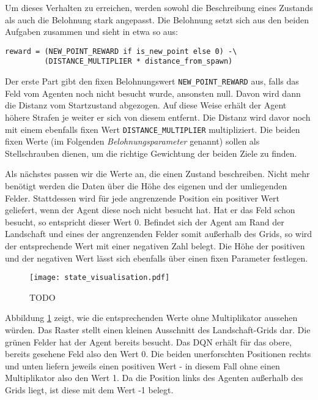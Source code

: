 Um dieses Verhalten zu erreichen, werden sowohl die Beschreibung eines Zustands als auch die Belohnung stark angepasst. Die Belohnung setzt sich aus den beiden Aufgaben zusammen und sieht in etwa so aus:
\begin{verbatim}
reward = (NEW_POINT_REWARD if is_new_point else 0) -\
         (DISTANCE_MULTIPLIER * distance_from_spawn)
\end{verbatim}
Der erste Part gibt den fixen Belohnungswert \texttt{NEW_POINT_REWARD} aus, falls das Feld vom Agenten noch nicht besucht wurde, ansonsten null. Davon wird dann die Distanz vom Startzustand abgezogen. Auf diese Weise erhält der Agent höhere Strafen je weiter er sich von diesem entfernt. Die Distanz wird davor noch mit einem ebenfalls fixen Wert \texttt{DISTANCE_MULTIPLIER} multipliziert. Die beiden fixen Werte (im Folgenden \textit{Belohnungsparameter} genannt) sollen als Stellschrauben dienen, um die richtige Gewichtung der beiden Ziele zu finden.

Als nächstes passen wir die Werte an, die einen Zustand beschreiben. Nicht mehr benötigt werden die Daten über die Höhe des eigenen und der umliegenden Felder. Stattdessen wird für jede angrenzende Position ein positiver Wert geliefert, wenn der Agent diese noch nicht besucht hat. Hat er das Feld schon besucht, so entspricht dieser Wert 0. Befindet sich der Agent am Rand der Landschaft und eines der angrenzenden Felder somit außerhalb des Grids, so wird der entsprechende Wert mit einer negativen Zahl belegt. Die Höhe der positiven und der negativen Wert lässt sich ebenfalls über einen fixen Parameter festlegen.
\begin{figure}[H]
    \centering
    \texttt{[image: state\_visualisation.pdf]}
    \caption{TODO} \label{img:stateVisualisation}
\end{figure}
Abbildung \ref{img:stateVisualisation} zeigt, wie die entsprechenden Werte ohne Multiplikator aussehen würden. Das Raster stellt einen kleinen Ausschnitt des Landschaft-Grids dar. Die grünen Felder hat der Agent bereits besucht. Das DQN erhält für das obere, bereits gesehene Feld also den Wert 0. Die beiden unerforschten Positionen rechts und unten liefern jeweils einen positiven Wert - in diesem Fall ohne einen Multiplikator also den Wert 1. Da die Position links des Agenten außerhalb des Grids liegt, ist diese mit dem Wert -1 belegt.

